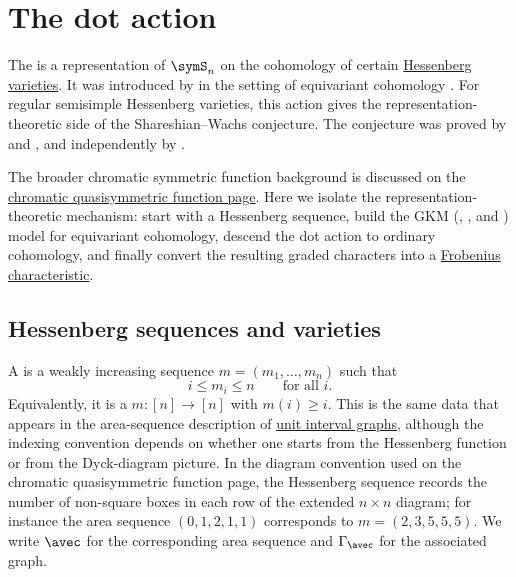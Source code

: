 

\section[dotAction]{The dot action}

The \label{tymoczkoDotAction} is a representation of $\symS_n$ on the cohomology
of certain \hyperref[hessenbergVarieties]{Hessenberg varieties}.
It was introduced by  in the setting of equivariant
cohomology \cite{Tymoczko2008,Tymoczko2008b}.
For regular semisimple Hessenberg varieties, this action gives the
representation-theoretic side of the Shareshian--Wachs conjecture.
The conjecture was proved by  and 
\cite{BrosnanChow2018}, and independently by 
\cite{GuayPaquet2016x}.

The broader chromatic symmetric function background is discussed on the
\hyperref[chromaticQuasisymmetricHessenberg]{chromatic quasisymmetric
function page}.  Here we isolate the representation-theoretic mechanism:
start with a Hessenberg sequence, build the GKM (,
, and ) model for equivariant
cohomology, descend the dot action to ordinary cohomology, and finally convert
the resulting graded characters into a
\hyperref[frobeniusCharacteristic]{Frobenius characteristic}.


\subsection[dotActionHessenbergSequence]{Hessenberg sequences and varieties}

\label{hessenbergVarieties}
A \label{hessenbergSequence} is a weakly increasing sequence
$m=(m_1,\dotsc,m_n)$ such that
\[
i\leq m_i\leq n
\qquad\text{for all } i.
\]
Equivalently, it is a \label{hessenbergFunction}
$m:[n]\to[n]$ with
$m(i)\geq i$.  This is the same data that appears in the area-sequence
description of \hyperref[chromaticQuasisymmetricUnitIntervalGraph]{unit interval graphs},
although the indexing convention depends on whether one starts from the
Hessenberg function or from the Dyck-diagram picture.  In the diagram convention
used on the chromatic quasisymmetric function page, the Hessenberg sequence
records the number of non-square boxes in each row of the extended
$n\times n$ diagram; for instance the area sequence
$(0,1,2,1,1)$ corresponds to $m=(2,3,5,5,5)$.  We write $\avec$ for the
corresponding area sequence and $\Gamma_\avec$ for the associated graph.

